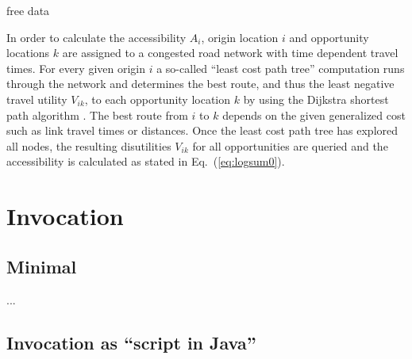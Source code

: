 free data





In order to calculate the accessibility $A_i$, origin location $i$ and opportunity locations $k$ are assigned to a congested road network with time dependent travel times. 
%
For every given origin $i$ a so-called ``least cost path tree'' computation runs through the network and determines the best route, and thus the least negative travel utility $V_{ik}$, to each opportunity location $k$ by using the Dijkstra shortest path algorithm \citep{Dijkstra1959ShortestPath}.  The best route from $i$ to $k$ depends on the given generalized cost such as link travel times or distances. Once the least cost path tree has explored all nodes, the resulting disutilities $V_{ik}$ for all opportunities are queried and the accessibility is calculated as stated in Eq.~(\ref{eq:logsum0}).



\section{Invocation}

\subsection{Minimal}

...



\subsection{Invocation as ``script in Java''}

